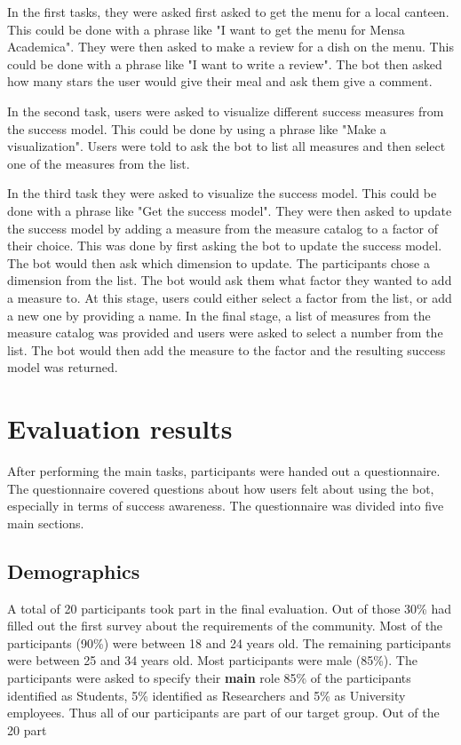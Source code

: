 In the first tasks, they were asked first asked to get the menu for a local canteen. This could be done with a phrase like "I want to get the menu for Mensa Academica".
They were then asked to make a review for a dish on the menu. This could be done with a phrase like "I want to write a review". The bot then asked how many stars the user would give their meal and ask them give a comment.  

In the second task, users were asked to visualize different success measures from the success model. This could be done by using a phrase like "Make a visualization". Users were told to ask the bot to list all measures and then select one of the measures from the list.

In the third task they were asked to visualize the success model. This could be done with a phrase like "Get the success model". They were then asked to update the success model by adding a measure from the measure catalog to a factor of their choice. 
This was done by first asking the bot to update the success model. The bot would then ask which dimension to update. 
The participants chose a dimension from the list. 
The bot would ask them what factor they wanted to add a measure to. 
At this stage, users could either select a factor from the list, or add a new one by providing a name. 
In the final stage, a list of measures from the measure catalog was provided and users were asked to select a number from the list. 
The bot would then add the measure to the factor and the resulting success model was returned.

\section{Evaluation results}

After performing the main tasks, participants were handed out a questionnaire.
The questionnaire covered questions about how users felt about using the bot, especially in terms of success awareness. The questionnaire was divided into five main sections. 

\subsection{Demographics}
A total of 20 participants took part in the final evaluation. Out of those 30\% had filled out the first survey about the requirements of the community. 
Most of the participants (90\%) were between 18 and 24 years old. The remaining participants were between 25 and 34 years old. Most participants were male (85\%).
The participants were asked to specify their \textbf{main} role 85\% of the participants identified as Students, 5\% identified as Researchers and 5\% as University employees. Thus all of our participants are part of our target group. Out of the 20 part 

